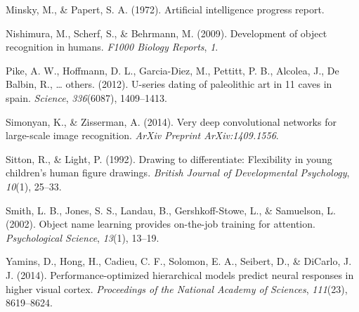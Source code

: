 \documentclass[10pt, letterpaper]{article}
\begin{document}
\hypertarget{ref-minsky1972artificial}{}
Minsky, M., \& Papert, S. A. (1972). Artificial intelligence progress
report.

\hypertarget{ref-nishimura2009}{}
Nishimura, M., Scherf, S., \& Behrmann, M. (2009). Development of object
recognition in humans. \emph{F1000 Biology Reports}, \emph{1}.

\hypertarget{ref-pike2012u}{}
Pike, A. W., Hoffmann, D. L., Garcia-Diez, M., Pettitt, P. B., Alcolea,
J., De Balbin, R., \ldots{} others. (2012). U-series dating of
paleolithic art in 11 caves in spain. \emph{Science}, \emph{336}(6087),
1409--1413.

\hypertarget{ref-simonyan2014very}{}
Simonyan, K., \& Zisserman, A. (2014). Very deep convolutional networks
for large-scale image recognition. \emph{ArXiv Preprint
ArXiv:1409.1556}.

\hypertarget{ref-sitton1992drawing}{}
Sitton, R., \& Light, P. (1992). Drawing to differentiate: Flexibility
in young children's human figure drawings. \emph{British Journal of
Developmental Psychology}, \emph{10}(1), 25--33.

\hypertarget{ref-smith2002object}{}
Smith, L. B., Jones, S. S., Landau, B., Gershkoff-Stowe, L., \&
Samuelson, L. (2002). Object name learning provides on-the-job training
for attention. \emph{Psychological Science}, \emph{13}(1), 13--19.

\hypertarget{ref-yamins2014performance}{}
Yamins, D., Hong, H., Cadieu, C. F., Solomon, E. A., Seibert, D., \&
DiCarlo, J. J. (2014). Performance-optimized hierarchical models predict
neural responses in higher visual cortex. \emph{Proceedings of the
National Academy of Sciences}, \emph{111}(23), 8619--8624.
\end{document}
